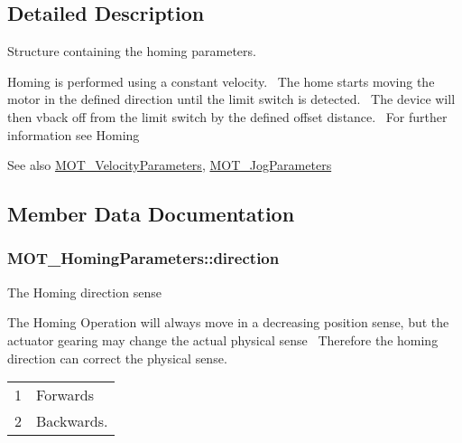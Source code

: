 \subsection{Detailed Description}
Structure containing the homing parameters. 

Homing is performed using a constant velocity.~\newline
 The home starts moving the motor in the defined direction until the limit switch is detected.~\newline
 The device will then vback off from the limit switch by the defined offset distance.~\newline
 For further information see Homing 

\begin{DoxySeeAlso}{See also}
\hyperlink{struct_m_o_t___velocity_parameters}{M\+O\+T\+\_\+\+Velocity\+Parameters}, \hyperlink{struct_m_o_t___jog_parameters}{M\+O\+T\+\_\+\+Jog\+Parameters}


\end{DoxySeeAlso}


\subsection{Member Data Documentation}
\subsubsection[{\texorpdfstring{direction}{direction}}]{ M\+O\+T\+\_\+\+Homing\+Parameters\+::direction}\hypertarget{struct_m_o_t___homing_parameters_ad609201d95a81d0abf0250188709f5db}{}\label{struct_m_o_t___homing_parameters_ad609201d95a81d0abf0250188709f5db}


The Homing direction sense 

The Homing Operation will always move in a decreasing position sense, but the actuator gearing may change the actual physical sense~\newline
 Therefore the homing direction can correct the physical sense. \tabulinesep=1mm
\begin{longtabu} spread 0pt [c]{*2{|X[-1]}|}
&Forwards \\
2&Backwards. \\
\end{longtabu}
